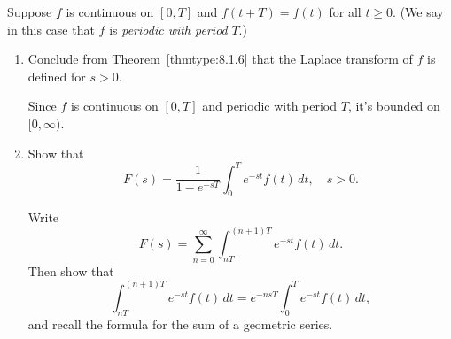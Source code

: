 \documentclass{ximera}
\begin{document}
\begin{problem}\label{exer:8.1.17}
  Suppose $f$ is continuous on $[0, T]$ and $f(t+T)=f(t)$
for all $t\ge 0$.  (We say in this case that $f$ is \emph{periodic with
period\/} $T$.)
\begin{enumerate}
\item %
 Conclude from Theorem~\ref{thmtype:8.1.6} that the Laplace transform of
$f$ is defined for $s>0$. 
\begin{hint}
   Since $f$ is
continuous on $[0,T]$ and periodic with period $T$, it's bounded
on $[0,\infty)$. 
\end{hint}
\item\label{exer:8.1.17b} %
Show that
$$
F(s)=\frac{1}{1-e^{-sT}}\int_0^T e^{-st}f(t)\,dt,\quad s>0.
$$
\begin{hint}
    Write
$$
F(s)=\sum^\infty_{n=0}\int^{(n+1)T}_{nT}e^{-st} f(t)\,dt.
$$
Then show that
$$
\int^{(n+1)T}_{nT} e^{-st}f(t)\,dt=e^{-nsT}\int_0^T e^{-st}f(t)\,dt,
$$
and recall the formula for the sum of a geometric series.
\end{hint}
\end{enumerate}
\end{problem}
\end{document}
